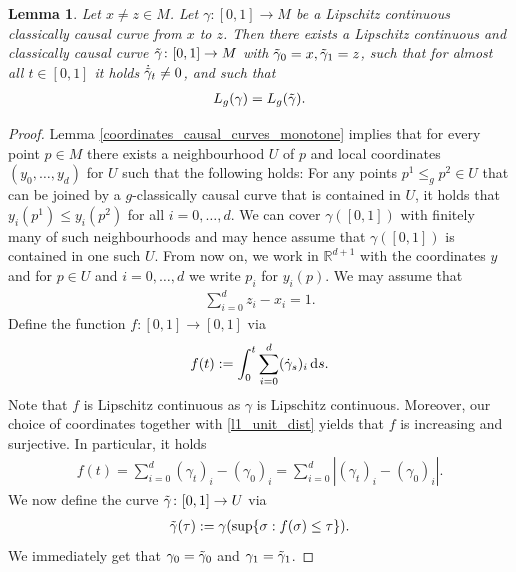 \documentclass[a4paper,10pt]{article}
\newtheorem{lemma}[theorem]{Lemma}
\numberwithin{equation}{section}
\newcommand{\R}{\mathbb{R}}
\newcommand{\di}{{\rm d}}
\begin{document}
\begin{lemma}\label{classically_causal_curve_non_constant}
    Let $x \neq z \in M$. Let $\gamma\colon[0,1] \to M$ be a Lipschitz continuous classically causal curve from $x$ to $z$. Then there exists a Lipschitz continuous and classically causal curve $\Tilde{\gamma}\colon[0,1] \to M$ with $\Tilde{\gamma}_0=x, \Tilde{\gamma}_1=z$, such that for almost all $t \in [0,1]$ it holds $\dot{\Tilde{\gamma}}_t \neq 0$, and such that 
    \begin{align*}
        L_g(\gamma) = L_g(\Tilde{\gamma}).
    \end{align*}
\end{lemma}
\begin{proof}
    Lemma \ref{coordinates_causal_curves_monotone} implies that for every point $p \in M$ there exists a neighbourhood $U$ of $p$ and local coordinates $(y_0, \ldots, y_d)$ for $U$ such that the following holds: For any points $p^1 \leq_g p^2 \in U$ that can be joined by a $g$-classically causal curve that is contained in $U$, it holds that $y_i(p^1) \leq y_i(p^2)$ for all $i =0, \ldots, d$.
    We can cover $\gamma([0,1])$ with finitely many of such neighbourhoods and may hence assume that $\gamma([0,1])$ is contained in one such $U$. From now on, we work in $\R^{d+1}$ with the coordinates $y$ and for $p \in U$ and $i =0, \ldots, d$ we write $p_i$ for $y_i(p)$. We may assume that
    \begin{align}\label{l1_unit_dist}
        \sum_{i=0}^d z_i-x_i =1.
    \end{align}
    Define the function $f\colon[0,1] \to [0,1]$ via
    \begin{align*}
        f(t):= \int_0^t \sum_{i=0}^d (\dot{\gamma}_s)_i\, \di s.
    \end{align*}
    Note that $f$ is Lipschitz continuous as $\gamma$ is Lipschitz continuous. Moreover, our choice of coordinates together with \eqref{l1_unit_dist} yields that $f$ is increasing and surjective. In particular, it holds
    \begin{align*}
        f(t) = \sum_{i=0}^d (\gamma_t)_i -(\gamma_0)_i = \sum_{i=0}^d |(\gamma_t)_i -(\gamma_0)_i|.
    \end{align*}
    We now define the curve $\Tilde{\gamma}\colon [0,1] \to U$ via
    \begin{align}
    \Tilde{\gamma}(\tau):= \gamma(\sup\{\sigma: f(\sigma) \leq \tau\}).
    \end{align}
    We immediately get that $\gamma_0=\Tilde{\gamma}_0$ and $\gamma_1=\Tilde{\gamma}_1$.

\end{proof}
\end{document}
